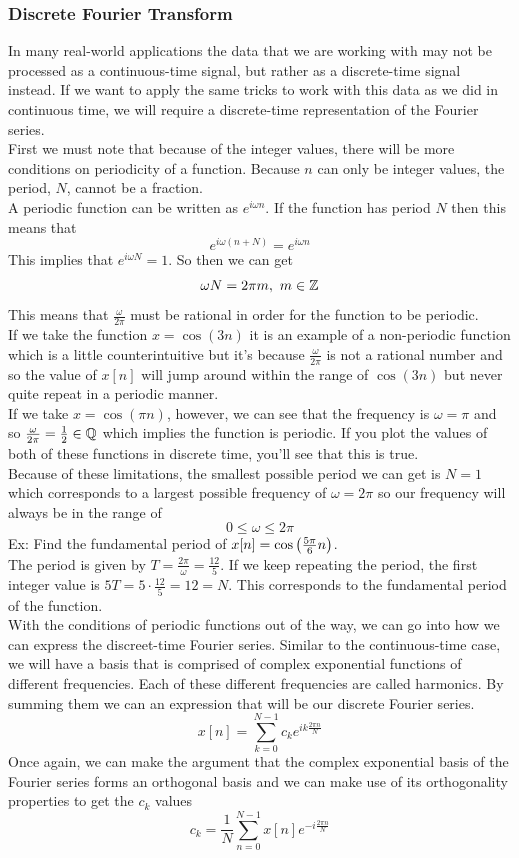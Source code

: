 \documentclass[11pt, fleqn]{article}
\begin{document}
\subsubsection{Discrete Fourier Transform}
In many real-world applications the data that we are working with may not be processed as a continuous-time signal, but rather as a discrete-time signal instead. If we want to apply the same tricks to work with this data as we did in continuous time, we will require a discrete-time representation of the Fourier series.\\
First we must note that because of the integer values, there will be more conditions on periodicity of a function. Because $n$ can only be integer values, the period, $N$, cannot be a fraction.\\
A periodic function can be written as $e^{i\omega n}$. If the function has period $N$ then this means that
\[ e^{i\omega (n+N)}=e^{i\omega n} \]
This implies that $e^{i\omega N}=1$. So then we can get
\[ \omega N=2\pi m,\ m\in\Z \]
This means that $\frac{\omega}{2\pi}$ must be rational in order for the function to be periodic.\\
If we take the function $x=\cos(3n)$ it is an example of a non-periodic function which is a little counterintuitive but it's because $\frac{\omega}{2\pi}$ is not a rational number and so the value of $x[n]$ will jump around within the range of $\cos(3n)$ but never quite repeat in a periodic manner.\\
If we take $x=\cos(\pi n)$, however, we can see that the frequency is $\omega=\pi$ and so $\frac{\omega}{2\pi}=\frac{1}{2}\in\mathbb{Q}$ which implies the function is periodic. If you plot the values of both of these functions in discrete time, you'll see that this is true.\\
Because of these limitations, the smallest possible period we can get is $N=1$ which corresponds to a largest possible frequency of $\omega=2\pi$ so our frequency will always be in the range of
$$0\leq\omega\leq 2\pi$$
Ex: Find the fundamental period of $x[n]=\cos\left( \frac{5\pi}{6}n \right)$.\\
The period is given by $T=\frac{2\pi}{\omega}=\frac{12}{5}$. If we keep repeating the period, the first integer value is $5T=5\cdot\frac{12}{5}=12=N$. This corresponds to the fundamental period of the function.\\

With the conditions of periodic functions out of the way, we can go into how we can express the discreet-time Fourier series. Similar to the continuous-time case, we will have a basis that is comprised of complex exponential functions of different frequencies. Each of these different frequencies are called harmonics. By summing them we can an expression that will be our discrete Fourier series.
$$\boxed{x[n]=\sum_{k=0}^{N-1}c_ke^{ik\frac{2\pi n}{N}}}$$
Once again, we can make the argument that the complex exponential basis of the Fourier series forms an orthogonal basis and we can make use of its orthogonality properties to get the $c_k$ values
$$\boxed{c_k=\frac{1}{N}\sum_{n=0}^{N-1}x[n]e^{-i\frac{2\pi n}{N}}}$$
\end{document}
